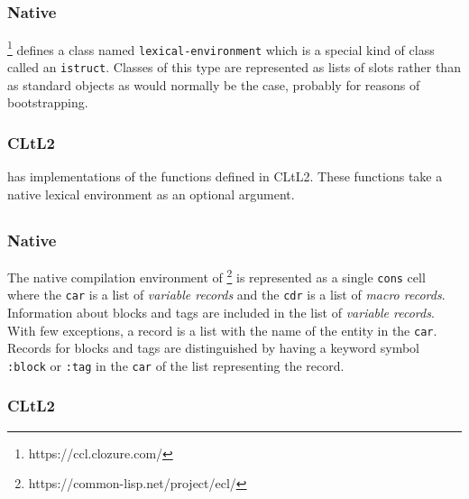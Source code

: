 \subsection{\ccl{}}

\subsubsection{Native}

\ccl{}%
\footnote{https://ccl.clozure.com/}
defines a class named \texttt{lexical-environment} which is a
special kind of class called an \texttt{istruct}.  Classes of this
type are represented as lists of slots rather than as standard objects
as would normally be the case, probably for reasons of bootstrapping.

\subsubsection{CLtL2}

\ccl{} has implementations of the functions defined in CLtL2.  These
functions take a native lexical environment as an optional argument.

\subsection{\cmucl{}}

\subsection{\ecl{}}

\subsubsection{Native}

The native compilation environment of \ecl{}%
\footnote{https://common-lisp.net/project/ecl/}
is represented as a single \texttt{cons} cell where the \texttt{car}
is a list of \emph{variable records} and the \texttt{cdr} is a list of
\emph{macro records}.  Information about blocks and tags are included
in the list of \emph{variable records}.  With few exceptions, a record
is a list with the name of the entity in the \texttt{car}.  Records
for blocks and tags are distinguished by having a keyword symbol
\texttt{:block} or \texttt{:tag} in the \texttt{car} of the list
representing the record.

\subsubsection{CLtL2}

